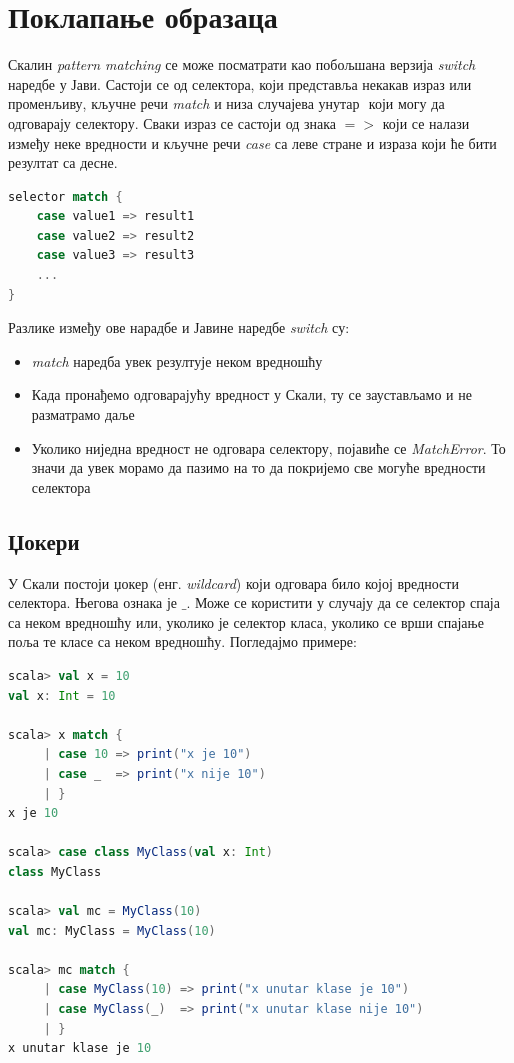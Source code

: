\documentclass[12pt,oneside]{memoir}
\begin{document}
\section{Поклапање образаца}
\label{sec:scala_patt_match}

Скалин \textit{pattern matching} се може посматрати као побољшана верзија \textit{switch} наредбе у Јави. Састоји се од селектора, који представља некакав израз или променљиву, кључне речи \textit{match} и низа случајева унутар ${}$ који могу да одговарају селектору. Сваки израз се састоји од знака $=>$ који се налази између неке вредности и кључне речи \textit{case} са леве стране и израза који ће бити резултат са десне. \cite{scala_prog}

\begin{lstlisting}[language=Scala, caption={}, label={lst:}]
selector match {
	case value1 => result1
	case value2 => result2
	case value3 => result3
	...
}
\end{lstlisting}

Разлике између ове нарадбе и Јавине наредбе \textit{switch} су:

\begin{itemize}
\item \textit{match} наредба увек резултује неком вредношћу
\item Када пронађемо одговарајућу вредност у Скали, ту се заустављамо и не разматрамо даље
\item Уколико ниједна вредност не одговара селектору, појавиће се \textit{MatchError}. То значи да увек морамо да пазимо на то да покријемо све могуће вредности селектора
\end{itemize}

\subsection{Џокери}
\label{subsec:scala_match_wildcard}

У Скали постоји џокер (енг. \textit{wildcard}) који одговара било којој вредности селектора. Његова ознака је $\_$. Може се користити у случају да се селектор спаја са неком вредношћу или, уколико је селектор класа, уколико се врши спајање поља те класе са неком вредношћу. Погледајмо примере: \cite{scala_prog}

\begin{lstlisting}[language=Scala, caption={}, label={lst:}]
scala> val x = 10
val x: Int = 10

scala> x match {
     | case 10 => print("x je 10")
     | case _  => print("x nije 10")
     | }
x je 10

scala> case class MyClass(val x: Int)
class MyClass

scala> val mc = MyClass(10)
val mc: MyClass = MyClass(10)

scala> mc match {
     | case MyClass(10) => print("x unutar klase je 10")
     | case MyClass(_)  => print("x unutar klase nije 10")
     | }
x unutar klase je 10
\end{lstlisting}
\end{document}
